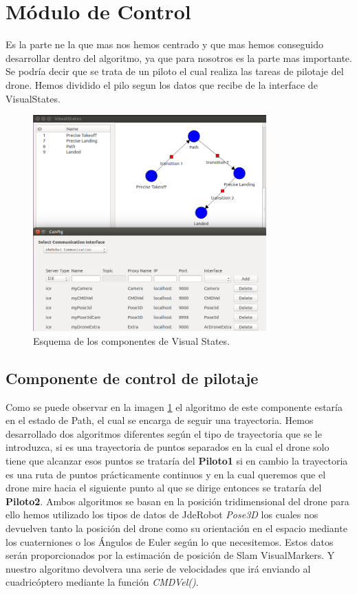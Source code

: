 \section{Módulo de Control}
\hspace{1cm} Es la parte ne la que mas nos hemos centrado y que mas hemos conseguido desarrollar dentro del algoritmo, ya que para nosotros es la parte mas importante. Se podría decir que se trata de un piloto el cual realiza las tareas de pilotaje del drone. Hemos dividido el pilo segun los datos que recibe de la interface de VisualStates.

\begin{figure}[H]
	\begin{center}
		\includegraphics[width=0.8\textwidth]{imag/IMG32.png}
				\caption{Esquema de los componentes de Visual States.}
		\label{fig:Esquema VisualStates.}	
	\end{center}
\end{figure}

\subsection{Componente de control de pilotaje}
\hspace{1cm} Como se puede observar en la imagen \ref{fig:Esquema VisualStates.} el algoritmo de este componente estaría en el estado de Path, el cual se encarga de seguir una trayectoria. Hemos desarrollado dos algoritmos diferentes según el tipo de trayectoria que se le introduzca, si es una trayectoria de puntos separados en la cual el drone solo tiene que alcanzar esos puntos se trataría del \textbf{Piloto1} si en cambio la trayectoria es una ruta de puntos prácticamente continuos y en la cual queremos que el drone mire hacia el siguiente punto al que se dirige entonces se trataría del \textbf{Piloto2}. Ambos algoritmos se basan en la posición tridimensional del drone para ello hemos utilizado los tipos de datos de JdeRobot \textit{Pose3D} los cuales nos devuelven tanto la posición del drone como su orientación en el espacio mediante los cuaterniones o los Ángulos de Euler según lo que necesitemos. Estos datos serán proporcionados por la estimación de posición de Slam VisualMarkers. Y nuestro algoritmo devolvera una serie de velocidades que irá enviando al cuadricóptero mediante la función \textit{CMDVel()}.

